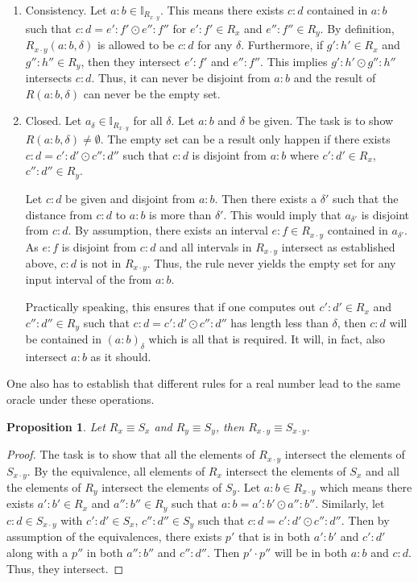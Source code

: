 \documentclass[12pt]{article}
\newtheorem{proposition}{Proposition}[section]
\begin{document}
\begin{enumerate}
    \item Consistency. Let $a:b \in \mathbb{I}_{R_{x\cdot y}}$. This means there exists $c:d$ contained in $a:b$ such that $c:d = e':f' \odot e'':f''$ for $e':f' \in R_x$ and $e'':f'' \in R_y$. By definition, $R_{x \cdot y}(a:b,\delta)$ is allowed to be $ c:d$ for any $\delta$. Furthermore, if $g':h' \in R_x$ and $g'':h'' \in R_y$, then they intersect $e':f'$ and $e'':f''$. This implies $g':h' \odot g'' : h''$ intersects $c:d$. Thus, it can never be disjoint from $a:b$ and the result of $R(a:b, \delta)$ can never be the empty set. 
        
    \item Closed.  Let $a_\delta \in \mathbb{I}_{R_{x\cdot y}}$ for all $\delta$. Let $a:b$ and $\delta$ be given. The task is to show $R(a:b, \delta) \neq \emptyset$. The empty set can be a result only happen if there exists $c:d = c':d' \odot c'':d''$ such that $c:d$ is disjoint from $a:b$ where $c':d' \in R_x$, $c'':d'' \in R_y$. 
    
    Let $c:d$ be given and disjoint from $a:b$. Then there exists a $\delta'$ such that the distance from $c:d$ to $a:b$ is more than $\delta'$. This would imply that $a_{\delta'}$ is disjoint from $c:d$. By assumption, there exists an interval $e:f \in R_{x \cdot y}$ contained in $a_{\delta'}$. As $e:f$ is disjoint from $c:d$ and all intervals in $R_{x \cdot y}$ intersect as established above, $c:d$ is not in $R_{x \cdot y}$. Thus, the rule never yields the empty set for any input interval of the from $a:b$. 

    Practically speaking, this ensures that if one computes out $c':d' \in R_x$ and $c'':d'' \in R_y$ such that $c:d = c':d' \odot c'':d''$ has length less than $\delta$, then $c:d$ will be contained in $(a:b)_\delta$ which is all that is required. It will, in fact, also intersect $a:b$ as it should.
    
\end{enumerate}

One also has to establish that different rules for a real number lead to the same oracle under these operations. 

\begin{proposition}
    Let $R_x \equiv S_x$ and $R_y \equiv S_y$, then $R_{x \cdot y} \equiv S_{x \cdot y}$.
\end{proposition}

\begin{proof}
The task is to show that all the elements of $R_{x \cdot y}$ intersect the elements of $S_{x \cdot y}$. By the equivalence, all elements of $R_x$ intersect the elements of $S_x$ and all the elements of $R_y$ intersect the elements of $S_y$. Let $a:b \in R_{x \cdot y}$ which means there exists $a':b' \in R_x$ and $a'':b'' \in R_y$ such that $a:b = a':b' \odot a'':b''$. Similarly, let $c:d \in S_{x \cdot y}$ with $c':d' \in S_x$, $c'':d'' \in S_y$ such that $c:d = c':d' \odot c'':d''$. Then by assumption of the equivalences, there exists $p'$ that is in both $a':b'$ and $c':d'$ along with a $p''$ in both $a'':b''$ and $c'':d''$. Then $p' \cdot p''$ will be in both $a:b$ and $c:d$. Thus, they intersect. 
\end{proof}
\end{document}
